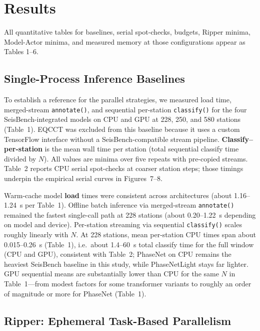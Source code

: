 \section{Results}

All quantitative tables for baselines, serial spot-checks, budgets, Ripper minima, Model-Actor minima, and measured memory at those configurations appear as Tables 1--6.

\subsection{Single-Process Inference Baselines}

To establish a reference for the parallel strategies, we measured load time, merged-stream \texttt{annotate()}, and sequential per-station \texttt{classify()} for the four SeisBench-integrated models on CPU and GPU at 228, 250, and 580 stations (Table~1). EQCCT was excluded from this baseline because it uses a custom TensorFlow interface without a SeisBench-compatible stream pipeline. \textbf{Classify--per-station} is the mean wall time per station (total sequential classify time divided by $N$). All values are minima over five repeats with pre-copied streams. Table~2 reports CPU serial spot-checks at coarser station steps; those timings underpin the empirical serial curves in Figures~7--8.

\clearpage


Warm-cache model \textbf{load} times were consistent across architectures (about 1.16--1.24~s per Table~1). Offline batch inference via merged-stream \texttt{annotate()} remained the fastest single-call path at 228 stations (about 0.20--1.22~s depending on model and device). Per-station streaming via sequential \texttt{classify()} scales roughly linearly with $N$. At 228 stations, mean per-station CPU times span about 0.015--0.26~s (Table~1), i.e.\ about 1.4--60~s total classify time for the full window (CPU and GPU), consistent with Table~2; PhaseNet on CPU remains the heaviest SeisBench baseline in this study, while PhaseNetLight stays far lighter. GPU sequential means are substantially lower than CPU for the same $N$ in Table~1---from modest factors for some transformer variants to roughly an order of magnitude or more for PhaseNet (Table~1).

\subsection{Ripper: Ephemeral Task-Based Parallelism}

